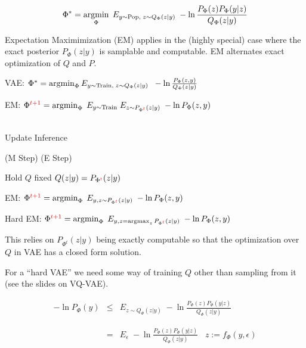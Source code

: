 {

$$\Phi^* = \operatorname*{argmin}_\Phi\; E_{y \sim \mathrm{Pop},\;z \sim Q_\Phi(z|y)}\;-\ln \frac{P_\Phi(z)P_\Phi(y|z)}{Q_\Phi(z|y)}$$


Expectation Maximimization (EM) applies in the (highly special) case where the exact posterior $P_\Phi(z|y)$ is samplable and computable.
EM alternates exact optimization of $Q$ and $P$.

\vfill
VAE: $\Phi^* = \operatorname*{argmin}_\Phi E_{y\sim \mathrm{Train},\;z \sim Q_\Phi(z|y)}\;\;- \ln \frac{P_\Phi(z,y)}{Q_\Phi(z|y)}$

\vfill
EM: $\Phi^{\color{red} t+1} =  \operatorname*{argmin}_\Phi\;E_{y \sim \mathrm{Train}}\;E_{z \sim P_{\Phi^{\color{red} t}}(z|y)}\; - \ln P_\Phi(z,y)$ \\
\\
\centerline{\hspace{1em} Update \hspace{6em} Inference \hspace{2.5em}~}
\centerline{(M Step) \hspace{5em} (E Step) \hspace{1.5em}~}
\centerline{Hold $Q$ fixed \hspace{2.5em} $Q(z|y) = P_{\Phi^{\color{red} t}}(z|y)$ \hspace{0em}~}


EM: $\Phi^{\color{red} t+1} =  \operatorname*{argmin}_\Phi\;E_{y,z \sim P_{\Phi^{\color{red} t}}(z|y)}\; - \ln P_\Phi(z,y)$

\vfill
Hard EM: $\Phi^{\color{red} t+1} =  \operatorname*{argmin}_\Phi\; E_{y, z = \operatorname*{argmax}_z P_{\Phi^{\color{red} t}}(z|y)} \;- \ln P_\Phi(z,y)$

\vfill
This relies on $P_{\Phi^t}(z|y)$ being exactly computable so that the optimization over $Q$ in VAE has a closed form solution.

\vfill
For a ``hard VAE'' we need some way of training $Q$ other than sampling from it (see the slides on VQ-VAE).


\begin{eqnarray*}
- \ln P_\Phi(y) & \leq & E_{z \sim Q_\Phi(z|y)}\;-\ln \frac{P_\Phi(z)P_\Phi(y|z)}{Q_\Phi(z|y)} \\
\\
\\
& = & E_\epsilon\;-\ln \frac{P_\Phi(z)P_\Phi(y|z)}{Q_\Phi(z|y)}\;\;\;z := f_\Phi(y,\epsilon)
\end{eqnarray*}

}
